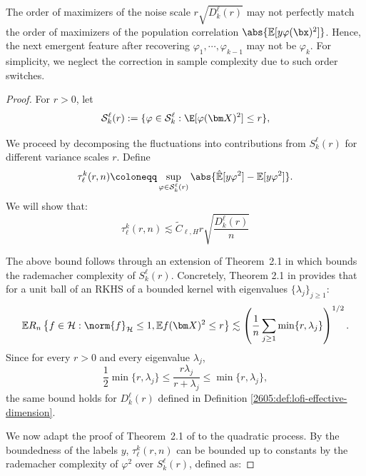\begin{remark}\label{2605:rem:order}
The order of maximizers of the noise scale $r\sqrt{D^\ell_k(r)}$ may not perfectly match the order of maximizers of the population correlation $\abs{\mathbb{E}[y \varphi(\bx)^2]}$. Hence, the next emergent feature after recovering $\varphi_1,\cdots,\varphi_{k-1}$ may not be $\varphi_{k}$. For simplicity, we neglect the correction in sample complexity due to such order switches.
\end{remark}
\begin{proof}

 For \(r>0\), let
\[
    \mathcal S^\ell_k(r)
    :=
    \{\varphi\in\mathcal S^\ell_k:\E[\varphi(\bm X)^2]\le r\},
\]

We proceed by decomposing the fluctuations into contributions from $ S^\ell_k(r)$ for different variance scales $r$. Define
\begin{equation}
    \tau^k_\ell(r,n)
    \coloneqq
    \sup_{\varphi \in \mathcal S^\ell_k(r)}
    \abs{\hat{\mathbb{E}}[y\varphi^2]-\mathbb{E}[y\varphi^2]} .
\end{equation}
We will show that:
\begin{equation}
    \tau^k_\ell(r,n)
    \lesssim
    \widetilde C_{\ell,H} 
    r\sqrt{\frac{D^\ell_k(r)}{n}}
    \label{2605:eq:lofi-noise-floor}
\end{equation}

The above bound follows through an extension of Theorem~2.1 in
\cite{mendelson2003performance} which bounds the rademacher complexity of $S^\ell_k(r)$. Concretely, Theorem 2.1 in \cite{mendelson2003performance} provides that for a unit ball of an RKHS of a bounded kernel with eigenvalues \(\{\lambda_j\}_{j\ge 1}\):
\[
    \mathbb E R_n
    \left\{
        f\in\mathcal H:\norm{f}_{\mathcal H}\le 1, 
        \mathbb E f(\bm X)^2\le r
    \right\}
    \lesssim
    \left(
        \frac{1}{n}\sum_{j\ge 1}\min\{r,\lambda_j\}
    \right)^{1/2}.
\]
Since for every \(r>0\) and every
eigenvalue \(\lambda_j\),
\[
    \frac12 \min\{r,\lambda_j\}
    \le
    \frac{r\lambda_j}{r+\lambda_j}
    \le
    \min\{r,\lambda_j\},
\]
the same bound holds for $D^\ell_k(r)$ defined in Definition \ref{2605:def:lofi-effective-dimension}.

We now adapt the proof of Theorem~2.1 of
\cite{mendelson2003performance} to the quadratic process. By the boundedness of the labels $y$, $\tau^k_\ell(r,n)$ can be bounded up to constants by the rademacher complexity of $\varphi^2$ over $S^\ell_k(r)$, defined as:


\end{proof}
